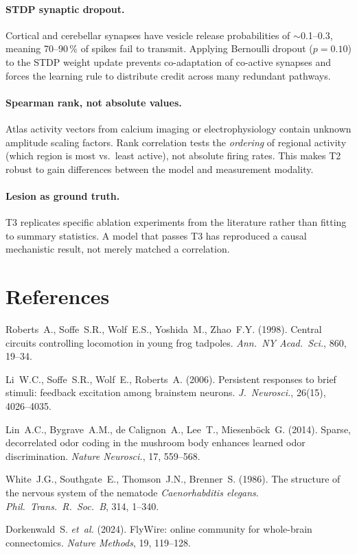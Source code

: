 \documentclass[11pt,a4paper]{article}
\begin{document}
\paragraph{STDP synaptic dropout.}
Cortical and cerebellar synapses have vesicle release probabilities
of $\sim$0.1--0.3, meaning 70--90\,\% of spikes fail to transmit.
Applying Bernoulli dropout ($p = 0.10$) to the STDP weight update
prevents co-adaptation of co-active synapses and forces the learning
rule to distribute credit across many redundant pathways.

\paragraph{Spearman rank, not absolute values.}
Atlas activity vectors from calcium imaging or electrophysiology
contain unknown amplitude scaling factors.
Rank correlation tests the \emph{ordering} of regional activity
(which region is most vs.\ least active), not absolute firing rates.
This makes T2 robust to gain differences between the model and
measurement modality.

\paragraph{Lesion as ground truth.}
T3 replicates specific ablation experiments from the literature
rather than fitting to summary statistics.
A model that passes T3 has reproduced a causal mechanistic result,
not merely matched a correlation.

\section*{References}

\noindent
Roberts~A., Soffe~S.R., Wolf~E.S., Yoshida~M., Zhao~F.Y. (1998).
Central circuits controlling locomotion in young frog tadpoles.
\textit{Ann.\ NY Acad.\ Sci.}, 860, 19--34.

\noindent
Li~W.C., Soffe~S.R., Wolf~E., Roberts~A. (2006).
Persistent responses to brief stimuli: feedback excitation among
brainstem neurons.
\textit{J.\ Neurosci.}, 26(15), 4026--4035.

\noindent
Lin~A.C., Bygrave~A.M., de Calignon~A., Lee~T., Miesenb\"{o}ck~G.
(2014). Sparse, decorrelated odor coding in the mushroom body
enhances learned odor discrimination.
\textit{Nature Neurosci.}, 17, 559--568.

\noindent
White~J.G., Southgate~E., Thomson~J.N., Brenner~S. (1986).
The structure of the nervous system of the nematode
\textit{Caenorhabditis elegans}.
\textit{Phil.\ Trans.\ R.\ Soc.\ B}, 314, 1--340.

\noindent
Dorkenwald~S. \textit{et~al.} (2024). FlyWire: online community for
whole-brain connectomics.
\textit{Nature Methods}, 19, 119--128.
\end{document}
